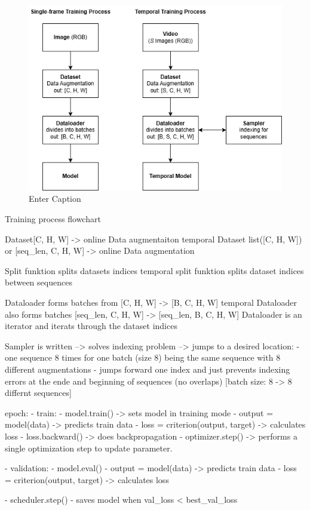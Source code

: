\begin{figure}[H]
    \centering
    \includegraphics[width=0.6\linewidth]{PICs/temporalModels/Datahandling.png}
    \caption{Enter Caption}
    \label{fig:enter-label}
\end{figure}

Training process flowchart

Dataset[C, H, W] -> online Data augmentaiton
temporal Dataset list([C, H, W]) or [seq\_len, C, H, W] -> online Data augmentation 

Split funktion splits datasets indices
temporal split funktion splits dataset indices between sequences

Dataloader forms batches from [C, H, W] -> [B, C, H, W]
temporal Dataloader also forms batches [seq\_len, C, H, W] -> [seq\_len, B, C, H, W]
Dataloader is an iterator and iterats through the dataset indices

Sampler is written --> solves indexing problem
--> jumps to a desired location:
    - one sequence 8 times for one batch (size 8) being the same sequence with 8 different augmentations
    - jumps forward one index and just prevents indexing errors at the ende and beginning of sequences (no overlaps) [batch size: 8 -> 8 differnt sequences]

epoch:
- train:
    - model.train() -> sets model in training mode
    - output = model(data) -> predicts train data
    - loss = criterion(output, target) -> calculates loss
    - loss.backward() -> does backpropagation
    - optimizer.step() -> performs a single optimization step to update parameter.

- validation:
    - model.eval()
    - output = model(data) -> predicts train data
    - loss = criterion(output, target) -> calculates loss

- scheduler.step()
- saves model when val\_loss < best\_val\_loss